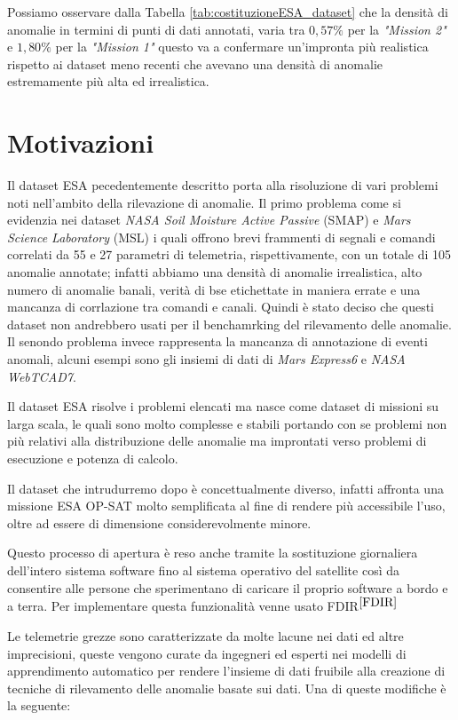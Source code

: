 Possiamo osservare dalla Tabella \ref{tab:costituzioneESA_dataset} che la densità di anomalie in termini di punti di dati annotati, varia tra $0,57\%$ per la \textit{"Mission 2"} e $1,80\%$ per la \textit{"Mission 1"} questo va a confermare un'impronta più realistica rispetto ai dataset meno recenti che avevano una densità di anomalie estremamente più alta ed irrealistica.

\section{Motivazioni}
Il dataset ESA pecedentemente descritto porta alla risoluzione di vari problemi noti nell'ambito della rilevazione di anomalie.
Il primo problema come si evidenzia nei dataset \textit{NASA Soil Moisture Active Passive} (SMAP) e  \textit{Mars Science Laboratory} (MSL) i quali offrono brevi frammenti di segnali e comandi correlati da 55 e 27 parametri di telemetria, rispettivamente, con un totale di 105 anomalie annotate; infatti abbiamo una densità di anomalie irrealistica, alto numero di anomalie banali, verità di bse etichettate in maniera errate e una mancanza di corrlazione tra comandi e canali. Quindi è stato deciso che questi dataset non andrebbero usati per il benchamrking del rilevamento delle anomalie.
Il senondo problema invece rappresenta la mancanza di annotazione di eventi anomali, alcuni esempi sono gli insiemi di dati di \textit{Mars Express6} e \textit{NASA WebTCAD7}.

Il dataset ESA risolve i problemi elencati ma nasce come dataset di missioni su larga scala, le quali sono molto complesse e stabili portando con se problemi non più relativi alla distribuzione delle anomalie ma improntati verso problemi di esecuzione e potenza di calcolo.

Il dataset che intrudurremo dopo è concettualmente diverso, infatti affronta una missione ESA OP-SAT molto semplificata al fine di rendere più accessibile l'uso, oltre ad essere di dimensione considerevolmente minore.

Questo processo di apertura è reso anche tramite la sostituzione giornaliera dell'intero sistema software fino al sistema operativo del satellite così da consentire alle persone che sperimentano di caricare il proprio software a bordo e a terra. Per implementare questa funzionalità venne usato FDIR$^{\cite{FDIR}}$

Le telemetrie grezze sono caratterizzate da molte lacune nei dati ed altre imprecisioni, queste vengono curate da ingegneri ed esperti nei modelli di apprendimento automatico per rendere l'insieme di dati fruibile alla creazione di tecniche di rilevamento delle anomalie basate sui dati.
Una di queste modifiche è la seguente:

